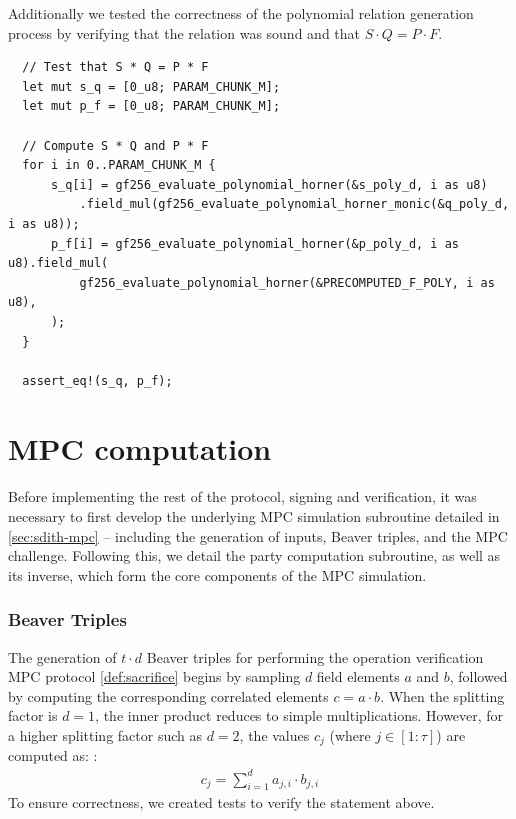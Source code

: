 \documentclass[11pt]{report}
\theoremstyle{definition}
\theoremstyle{plain}
\newcommand{\todo}[1]{{\color[rgb]{.5,0,0}\textbf{$\blacktriangleright$#1$\blacktriangleleft$}}}
\begin{document}
Additionally we tested the correctness of the polynomial relation generation process by verifying that the relation was sound and that $S \cdot Q = P \cdot F$.

\begin{verbatim}
  // Test that S * Q = P * F
  let mut s_q = [0_u8; PARAM_CHUNK_M];
  let mut p_f = [0_u8; PARAM_CHUNK_M];

  // Compute S * Q and P * F
  for i in 0..PARAM_CHUNK_M {
      s_q[i] = gf256_evaluate_polynomial_horner(&s_poly_d, i as u8)
          .field_mul(gf256_evaluate_polynomial_horner_monic(&q_poly_d, i as u8));
      p_f[i] = gf256_evaluate_polynomial_horner(&p_poly_d, i as u8).field_mul(
          gf256_evaluate_polynomial_horner(&PRECOMPUTED_F_POLY, i as u8),
      );
  }

  assert_eq!(s_q, p_f);
\end{verbatim}

\section{MPC computation}\label{sub:mpc_algo}
Before implementing the rest of the protocol, signing and verification, it was necessary to first develop the underlying MPC simulation subroutine detailed in \autoref{sec:sdith-mpc} -- including the generation of inputs, Beaver triples, and the MPC challenge. Following this, we detail the party computation subroutine, as well as its inverse, which form the core components of the MPC simulation.


\subsubsection{Beaver Triples}
The generation of $t \cdot d$ Beaver triples for performing the operation verification MPC protocol \autoref{def:sacrifice} begins by sampling $d$ field elements $a$ and $b$, followed by computing the corresponding correlated elements $c = a \cdot b$. When the splitting factor is $d=1$, the inner product reduces to simple multiplications. However, for a higher splitting factor such as $d=2$, the values $c_j$ (where $j \in [1:\tau]$) are computed as:
:
\begin{align}
  c_j = \sum_{i=1}^{d} a_{ j,i } \cdot b_{j,i}
\end{align}
To ensure correctness, we created tests to verify the statement above.
\end{document}
